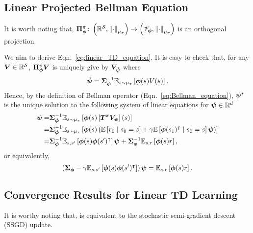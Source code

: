\subsection{Linear Projected Bellman Equation}\label{subsection:linear_projected_bellman_equation}
It is worth noting that, ${\bm{\Pi}}_{{\bm{\phi}}}^{\pi}\colon \left({{\mathbb R}^{\mathcal{S}},\left\|{\cdot}\right\|_{\mu_\pi}}\right)\to\left({{\mathscr{V}}_{\bm{\phi}},\left\|{\cdot}\right\|_{\mu_\pi}}\right)$ is an orthogonal projection.

We aim to derive Eqn.~\eqref{eq:linear_TD_equation}.
It is easy to check that, for any ${\bm{V}}\in {\mathbb R}^{{\mathcal{S}}}$, ${\bm{\Pi}}_{{\bm{\phi}}}^{\pi}{\bm{V}}$ is uniquely give by $ {\bm{V}}_{\tilde{{\bm{\psi}}}}$ where
\begin{equation*}
    \tilde{{\bm{\psi}}}={\bm{\Sigma}}_{{\bm{\phi}}}^{-1}{\mathbb E}_{s\sim\mu_\pi}\left[{{\bm{\phi}}(s)V(s)}\right].
\end{equation*}
Hence, by the definition of Bellman operator (Eqn.~\eqref{eq:Bellman_equation}), ${\bm{\psi}}^{\star}$ is the unique solution to the following system of linear equations for ${\bm{\psi}}\in{\mathbb R}^{d}$
\begin{equation*}
    \begin{aligned}
    {\bm{\psi}}=&{\bm{\Sigma}}_{{\bm{\phi}}}^{-1}{\mathbb E}_{s\sim\mu_{\pi}}\left[{{\bm{\phi}}(s)\left[{{\bm{T}}^\pi {\bm{V}}_{{\bm{\psi}}}}\right](s)}\right]\\
    =&{\bm{\Sigma}}_{{\bm{\phi}}}^{-1}{\mathbb E}_{s\sim\mu_{\pi}}\left[{{\bm{\phi}}(s)\left({{\mathbb E}\left[{r_0\mid s_0=s }\right]+\gamma{\mathbb E}\left[{ {\bm{\phi}}(s_1)^{\intercal}\mid s_0=s }\right]{\bm{\psi}}}\right)}\right]\\
    =&{\bm{\Sigma}}_{{\bm{\phi}}}^{-1}{\mathbb E}_{s,s^\prime}\left[{{\bm{\phi}}(s){\bm{\phi}}(s^\prime)^{\intercal}}\right]{\bm{\psi}}+{\bm{\Sigma}}_{{\bm{\phi}}}^{-1}{\mathbb E}_{s,r}\left[{{\bm{\phi}}(s)r}\right],
    \end{aligned}
\end{equation*}
or equivalently,
\begin{equation*}
    \begin{aligned}
    \left({{\bm{\Sigma}}_{{\bm{\phi}}}-\gamma{\mathbb E}_{s,s^\prime}\left[{{\bm{\phi}}(s){\bm{\phi}}(s^\prime)^{\intercal}}\right]}\right){\bm{\psi}}={\mathbb E}_{s,r}\left[{{\bm{\phi}}(s)r}\right].
    \end{aligned}
\end{equation*}

\subsection{Convergence Results for Linear TD Learning}\label{subsection:convergence_linear_TD}
It is worthy noting that, {\LTD} is equivalent to the stochastic semi-gradient descent (SSGD) update.

